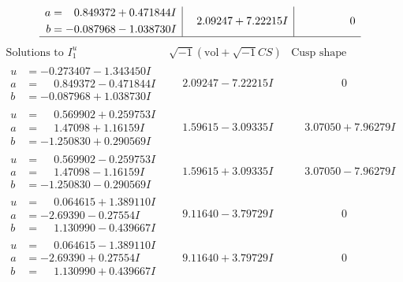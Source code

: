 \documentclass[1p]{elsarticle_modified}
\theoremstyle{definition}
\newcommand{\I}{\sqrt{-1}}
\begin{document}
$$\begin{array}{c|c|c}
\begin{aligned}
a &= \phantom{-}0.849372 + 0.471844 I \\
b &= -0.087968 - 1.038730 I\end{aligned}
 & \phantom{-}2.09247 + 7.22215 I & \phantom{-0.000000 } 0\\
 \hline 
 \end{array}$$\newpage$$\begin{array}{c|c|c}  
\text{Solutions to }I^u_{1}& \I (\text{vol} + \sqrt{-1}CS) & \text{Cusp shape}\\
 \hline 
\begin{aligned}
u &= -0.273407 - 1.343450 I \\
a &= \phantom{-}0.849372 - 0.471844 I \\
b &= -0.087968 + 1.038730 I\end{aligned}
 & \phantom{-}2.09247 - 7.22215 I & \phantom{-0.000000 } 0 \\ \hline\begin{aligned}
u &= \phantom{-}0.569902 + 0.259753 I \\
a &= \phantom{-}1.47098 + 1.16159 I \\
b &= -1.250830 + 0.290569 I\end{aligned}
 & \phantom{-}1.59615 - 3.09335 I & \phantom{-}3.07050 + 7.96279 I \\ \hline\begin{aligned}
u &= \phantom{-}0.569902 - 0.259753 I \\
a &= \phantom{-}1.47098 - 1.16159 I \\
b &= -1.250830 - 0.290569 I\end{aligned}
 & \phantom{-}1.59615 + 3.09335 I & \phantom{-}3.07050 - 7.96279 I \\ \hline\begin{aligned}
u &= \phantom{-}0.064615 + 1.389110 I \\
a &= -2.69390 - 0.27554 I \\
b &= \phantom{-}1.130990 - 0.439667 I\end{aligned}
 & \phantom{-}9.11640 - 3.79729 I & \phantom{-0.000000 } 0 \\ \hline\begin{aligned}
u &= \phantom{-}0.064615 - 1.389110 I \\
a &= -2.69390 + 0.27554 I \\
b &= \phantom{-}1.130990 + 0.439667 I\end{aligned}
 & \phantom{-}9.11640 + 3.79729 I & \phantom{-0.000000 } 0 \\ \hline\begin{aligned}

\end{aligned}
\end{array}$$
\end{document}
